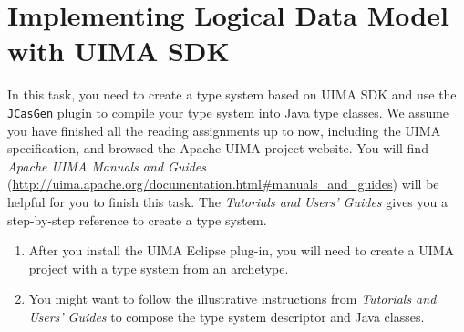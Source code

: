 
\chapter{Implementing Logical Data Model with UIMA SDK}

In this task, you need to create a type system based on UIMA SDK and use the
\texttt{JCasGen} plugin to compile your type system into Java type classes.
We assume you have finished all the reading assignments up to now, including the
UIMA specification, and browsed the Apache UIMA project website. You will find
\emph{Apache UIMA Manuals and Guides}
(\url{http://uima.apache.org/documentation.html#manuals_and_guides}) will be
helpful for you to finish this task. The \emph{Tutorials and Users' Guides}
gives you a step-by-step reference to create a type system.

\begin{enumerate}

\item After you install the UIMA Eclipse plug-in, you will need to create a
UIMA project with a type system from an archetype.

\item You might want to follow the illustrative instructions from
\emph{Tutorials and Users' Guides} to compose the type system descriptor and
Java classes.

\end{enumerate}








